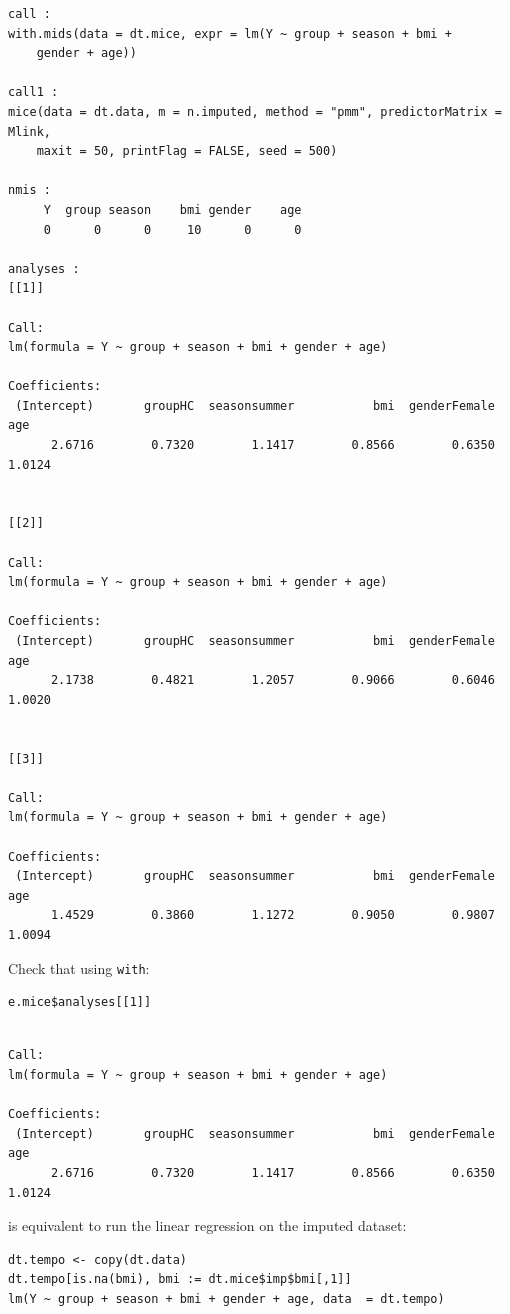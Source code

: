 \documentclass[12pt]{article}
\begin{document}
\begin{verbatim}
call :
with.mids(data = dt.mice, expr = lm(Y ~ group + season + bmi + 
    gender + age))

call1 :
mice(data = dt.data, m = n.imputed, method = "pmm", predictorMatrix = Mlink, 
    maxit = 50, printFlag = FALSE, seed = 500)

nmis :
     Y  group season    bmi gender    age 
     0      0      0     10      0      0 

analyses :
[[1]]

Call:
lm(formula = Y ~ group + season + bmi + gender + age)

Coefficients:
 (Intercept)       groupHC  seasonsummer           bmi  genderFemale           age  
      2.6716        0.7320        1.1417        0.8566        0.6350        1.0124  


[[2]]

Call:
lm(formula = Y ~ group + season + bmi + gender + age)

Coefficients:
 (Intercept)       groupHC  seasonsummer           bmi  genderFemale           age  
      2.1738        0.4821        1.2057        0.9066        0.6046        1.0020  


[[3]]

Call:
lm(formula = Y ~ group + season + bmi + gender + age)

Coefficients:
 (Intercept)       groupHC  seasonsummer           bmi  genderFemale           age  
      1.4529        0.3860        1.1272        0.9050        0.9807        1.0094
\end{verbatim}

Check that using \texttt{with}:
\lstset{language=r,label= ,caption= ,captionpos=b,numbers=none}
\begin{lstlisting}
e.mice$analyses[[1]]
\end{lstlisting}

\begin{verbatim}

Call:
lm(formula = Y ~ group + season + bmi + gender + age)

Coefficients:
 (Intercept)       groupHC  seasonsummer           bmi  genderFemale           age  
      2.6716        0.7320        1.1417        0.8566        0.6350        1.0124
\end{verbatim}

is equivalent to run the linear regression on the imputed dataset:
\lstset{language=r,label= ,caption= ,captionpos=b,numbers=none}
\begin{lstlisting}
dt.tempo <- copy(dt.data)
dt.tempo[is.na(bmi), bmi := dt.mice$imp$bmi[,1]]
lm(Y ~ group + season + bmi + gender + age, data  = dt.tempo)
\end{lstlisting}
\end{document}
